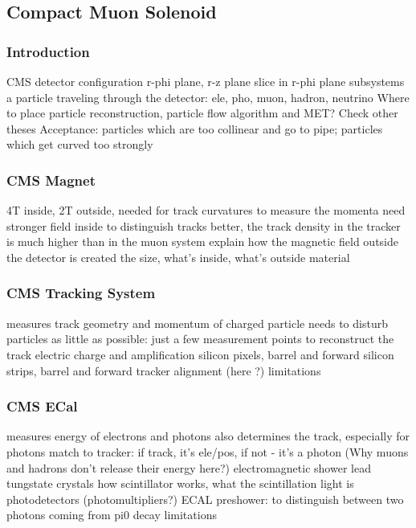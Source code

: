 \subsection{Compact Muon Solenoid}

\subsubsection{Introduction}

CMS detector configuration
r-phi plane, r-z plane
slice in r-phi plane
subsystems
a particle traveling through the detector:
ele, pho, muon, hadron, neutrino
Where to place particle reconstruction, particle flow algorithm and MET? Check other theses
Acceptance: particles which are too collinear and go to pipe; particles which get curved too strongly

\subsubsection{CMS Magnet}
4T inside, 2T outside, needed for track curvatures to measure the momenta
need stronger field inside to distinguish tracks better, the track density in the tracker is much higher than in the muon system
explain how the magnetic field outside the detector is created
the size, what's inside, what's outside
material

\subsubsection{CMS Tracking System}
measures track geometry and momentum of charged particle
needs to disturb particles as little as possible: just a few measurement points to reconstruct the track
electric charge and amplification
silicon pixels, barrel and forward
silicon strips, barrel and forward
tracker alignment (here ?)
limitations

\subsubsection{CMS ECal}
measures energy of electrons and photons
also determines the track, especially for photons
match to tracker: if track, it's ele/pos, if not - it's a photon
(Why muons and hadrons don't release their energy here?)
electromagnetic shower
lead tungstate crystals
how scintillator works, what the scintillation light is
photodetectors (photomultipliers?)
ECAL preshower: to distinguish between two photons coming from pi0 decay
limitations


